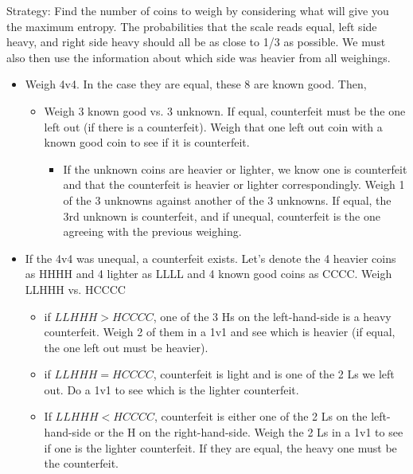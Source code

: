 \documentclass[12pt]{article}
\begin{document}
Strategy: Find the number of coins to weigh by considering what will give you the maximum entropy. The probabilities that the scale reads equal, left side heavy, and right side heavy should all be as close to 1/3 as possible. We must also then use the information about which side was heavier from all weighings. 


\begin{itemize}
\item Weigh 4v4. In the case they are equal, these 8 are known good. Then,
\begin{itemize}
   \item Weigh 3 known good vs. 3 unknown. If equal, counterfeit must be the one left out (if there is a counterfeit). Weigh that one left out coin with a known good coin to see if it is counterfeit.


    \begin{itemize}
    \item If the unknown coins are heavier or lighter, we know one is counterfeit and that the counterfeit is heavier or lighter correspondingly. Weigh 1 of the 3 unknowns against another of the 3 unknowns. If equal, the 3rd unknown is counterfeit, and if unequal, counterfeit is the one agreeing with the previous weighing.
    \end{itemize}
\end{itemize}
\item If the 4v4 was unequal, a counterfeit exists. Let's denote the 4 heavier coins as HHHH and 4 lighter as LLLL and 4 known good coins as CCCC. Weigh LLHHH vs. HCCCC
\begin{itemize}
    \item if $LLHHH > HCCCC$, one of the 3 Hs on the left-hand-side is a heavy counterfeit. Weigh 2 of them in a 1v1 and see which is heavier (if equal, the one left out must be heavier).
    \item if $LLHHH = HCCCC$, counterfeit is light and is one of the 2 Ls we left out. Do a 1v1 to see which is the lighter counterfeit.
    \item If $LLHHH < HCCCC$, counterfeit is either one of the 2 Ls on the left-hand-side or the H on the right-hand-side. Weigh the 2 Ls in a 1v1 to see if one is the lighter counterfeit. If they are equal, the heavy one must be the counterfeit.
    \end{itemize}
\end{itemize}
\end{document}
